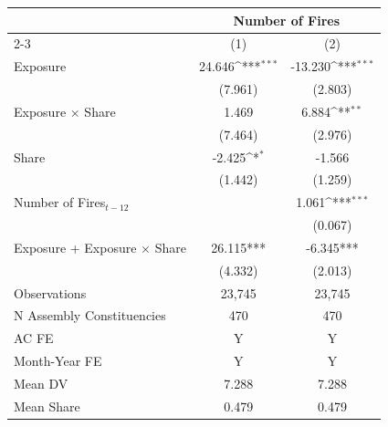 {
\def\sym#1{\ifmmode^{#1}\else\(^{#1}\)\fi}
\begin{tabular}{l*{2}{c}}
\toprule
            &\multicolumn{2}{c}{Number of Fires}        \\\cmidrule(lr){2-3}
            &\multicolumn{1}{c}{(1)}         &\multicolumn{1}{c}{(2)}         \\
\midrule
Exposure    &      24.646\sym{***}&     -13.230\sym{***}\\
            &     (7.961)         &     (2.803)         \\
Exposure $\times$ Share&       1.469         &       6.884\sym{**} \\
            &     (7.464)         &     (2.976)         \\
Share       &      -2.425\sym{*}  &      -1.566         \\
            &     (1.442)         &     (1.259)         \\
Number of Fires$_{t-12}$&                     &       1.061\sym{***}\\
            &                     &     (0.067)         \\
\midrule
Exposure + Exposure $\times$ Share&   26.115***         &   -6.345***         \\
            &     (4.332)         &     (2.013)         \\
Observations&      23,745         &      23,745         \\
N Assembly Constituencies&         470         &         470         \\
AC FE       &           Y         &           Y         \\
Month-Year FE&           Y         &           Y         \\
Mean DV     &       7.288         &       7.288         \\
Mean Share  &       0.479         &       0.479         \\
\bottomrule
\end{tabular}
}

